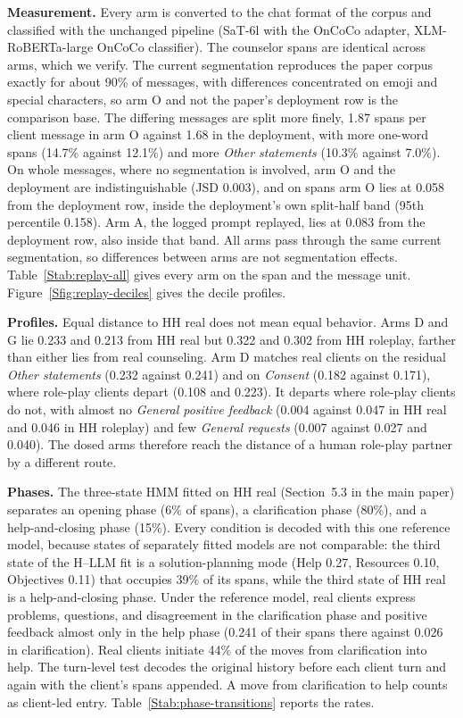 \documentclass[fleqn,10pt]{JLA_article}
\begin{document}
\textbf{Measurement.} Every arm is converted to the chat format of the corpus and classified with the unchanged pipeline (SaT-6l with the OnCoCo adapter, XLM-RoBERTa-large OnCoCo classifier). The counselor spans are identical across arms, which we verify. The current segmentation reproduces the paper corpus exactly for about 90\% of messages, with differences concentrated on emoji and special characters, so arm O and not the paper's deployment row is the comparison base. The differing messages are split more finely, 1.87 spans per client message in arm O against 1.68 in the deployment, with more one-word spans (14.7\% against 12.1\%) and more \emph{Other statements} (10.3\% against 7.0\%). On whole messages, where no segmentation is involved, arm O and the deployment are indistinguishable (JSD 0.003), and on spans arm O lies at 0.058 from the deployment row, inside the deployment's own split-half band (95th percentile 0.158). Arm A, the logged prompt replayed, lies at 0.083 from the deployment row, also inside that band. All arms pass through the same current segmentation, so differences between arms are not segmentation effects. Table~\ref{Stab:replay-all} gives every arm on the span and the message unit. Figure~\ref{Sfig:replay-deciles} gives the decile profiles.

\textbf{Profiles.} Equal distance to HH real does not mean equal behavior. Arms D and G lie 0.233 and 0.213 from HH real but 0.322 and 0.302 from HH roleplay, farther than either lies from real counseling. Arm D matches real clients on the residual \emph{Other statements} (0.232 against 0.241) and on \emph{Consent} (0.182 against 0.171), where role-play clients depart (0.108 and 0.223). It departs where role-play clients do not, with almost no \emph{General positive feedback} (0.004 against 0.047 in HH real and 0.046 in HH roleplay) and few \emph{General requests} (0.007 against 0.027 and 0.040). The dosed arms therefore reach the distance of a human role-play partner by a different route.

\textbf{Phases.} The three-state HMM fitted on HH real (Section~5.3 in the main paper) separates an opening phase (6\% of spans), a clarification phase (80\%), and a help-and-closing phase (15\%). Every condition is decoded with this one reference model, because states of separately fitted models are not comparable: the third state of the H--LLM fit is a solution-planning mode (Help 0.27, Resources 0.10, Objectives 0.11) that occupies 39\% of its spans, while the third state of HH real is a help-and-closing phase. Under the reference model, real clients express problems, questions, and disagreement in the clarification phase and positive feedback almost only in the help phase (0.241 of their spans there against 0.026 in clarification). Real clients initiate 44\% of the moves from clarification into help. The turn-level test decodes the original history before each client turn and again with the client's spans appended. A move from clarification to help counts as client-led entry. Table~\ref{Stab:phase-transitions} reports the rates.
\end{document}
